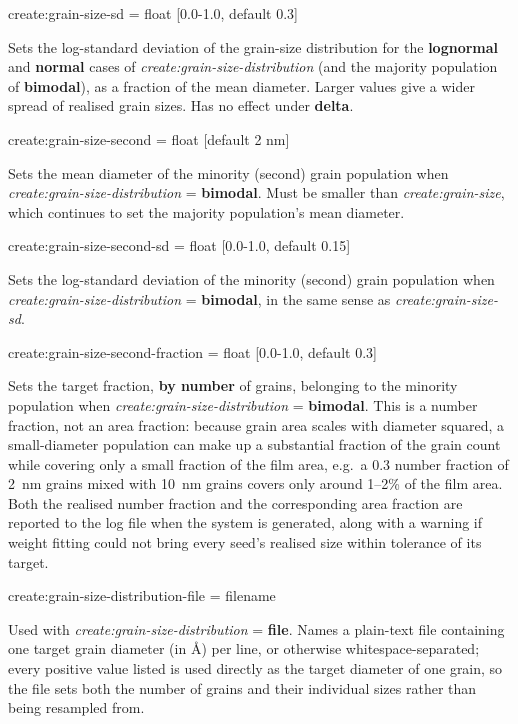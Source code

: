 {\zicf create:grain-size-sd = float [0.0-1.0, default 0.3]} Sets the log-standard deviation of the grain-size distribution for the \textbf{lognormal} and \textbf{normal} cases of \textit{create:grain-size-distribution} (and the majority population of \textbf{bimodal}), as a fraction of the mean diameter. Larger values give a wider spread of realised grain sizes. Has no effect under \textbf{delta}.

{\zicf create:grain-size-second = float [default 2 nm]} Sets the mean diameter of the minority (second) grain population when \textit{create:grain-size-distribution} = \textbf{bimodal}. Must be smaller than \textit{create:grain-size}, which continues to set the majority population's mean diameter.

{\zicf create:grain-size-second-sd = float [0.0-1.0, default 0.15]} Sets the log-standard deviation of the minority (second) grain population when \textit{create:grain-size-distribution} = \textbf{bimodal}, in the same sense as \textit{create:grain-size-sd}.

{\zicf create:grain-size-second-fraction = float [0.0-1.0, default 0.3]} Sets the target fraction, \textbf{by number} of grains, belonging to the minority population when \textit{create:grain-size-distribution} = \textbf{bimodal}. This is a number fraction, not an area fraction: because grain area scales with diameter squared, a small-diameter population can make up a substantial fraction of the grain count while covering only a small fraction of the film area, e.g.\ a 0.3 number fraction of 2~nm grains mixed with 10~nm grains covers only around 1--2\% of the film area. Both the realised number fraction and the corresponding area fraction are reported to the log file when the system is generated, along with a warning if weight fitting could not bring every seed's realised size within tolerance of its target.

{\zicf create:grain-size-distribution-file = filename} Used with \textit{create:grain-size-distribution} = \textbf{file}. Names a plain-text file containing one target grain diameter (in \AA) per line, or otherwise whitespace-separated; every positive value listed is used directly as the target diameter of one grain, so the file sets both the number of grains and their individual sizes rather than being resampled from.

